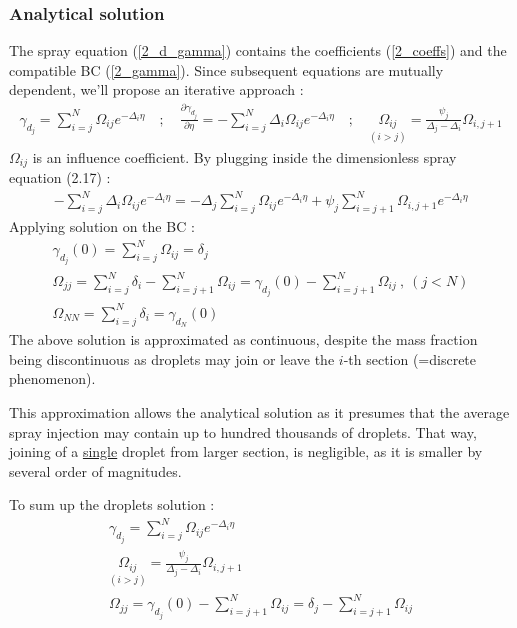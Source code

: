 \documentclass[12pt]{article}
\numberwithin{equation}{section}
\begin{document}
\begin{flushleft}
\subsubsection{Analytical solution}

The spray equation (\ref{2_d_gamma}) contains the coefficients (\ref{2_coeffs}) and the compatible BC (\ref{2_gamma}). Since subsequent equations are mutually dependent, we'll propose an iterative approach :
\begin{align} 
\gamma_{d_{j}}=\sum_{i=j}^{N} \Omega_{i j} e^{-\Delta_{i} \eta} \quad ; \quad \frac{\partial \gamma_{d_{j}}}{\partial \eta}=-\sum_{i=j}^{N} \Delta_{i} \Omega_{i j} e^{-\Delta_{i} \eta} \quad ; \quad  \underset{(i>j)}{\Omega_{i j}}=\frac{\psi_{j}}{\Delta_{j}-\Delta_{i}} \Omega_{i, j+1} \label{2_dimen_less}
\end{align}
$\Omega_{i j}$ is an influence coefficient. By plugging inside the dimensionless spray equation (2.17) :
\begin{align} 
-\sum_{i=j}^{N} \Delta_{i} \Omega_{i j} e^{-\Delta_{i} \eta}=-\Delta_{j} \sum_{i=j}^{N} \Omega_{i j} e^{-\Delta_{i}\eta}+\psi_{j} \sum_{i=j+1}^{N} \Omega_{i, j+1} e^{-\Delta_{i} \eta}
\end{align}
Applying solution on the BC :
\begin{align} 
\gamma_{d_{j}}(0)=\sum_{i=j}^{N} \Omega_{i j}= \delta_{j} \\
\Omega_{j j}=\sum_{i=j}^{N} \delta_{i}-\sum_{i=j+1}^{N} \Omega_{i j}=\gamma_{d_{j}}(0)-\sum_{i=j+1}^{N} \Omega_{i j}\ , \ (j<N) \\
\Omega_{N N}=\sum_{i=j}^{N} \delta_{i}=\gamma_{d_{N}}(0)
\end{align}
The above solution is approximated as continuous, despite the mass fraction being discontinuous as droplets may join or leave the $i$-th section (=discrete phenomenon). 

This approximation allows the analytical solution as it presumes that the average spray injection may contain up to hundred thousands of droplets. That way, joining of a \underline{single} droplet from larger section, is negligible, as it is smaller by several order of magnitudes.

To sum up the droplets solution :
\begin{align} 
\gamma_{d_{j}}=\sum_{i=j}^{N} \Omega_{i j} e^{-\Delta_{i} \eta} \\
\underset{(i>j)}{\Omega_{i j}} = \frac{\psi_{j}}{\Delta_{j}-\Delta_{i}} \Omega_{i, j+1} \\
\Omega_{j j}=\gamma_{d_{j}}(0)-\sum_{i=j+1}^{N} \Omega_{i j}=\delta_{j}-\sum_{i=j+1}^{N} \Omega_{i j}
\end{align}


\end{flushleft}
\end{document}
